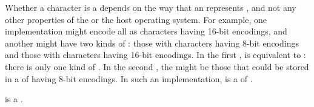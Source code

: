% 
 
Whether a character is a  depends on the way 
that an  represents , 
and not any other properties of the  or the host operating system.  
For example, one implementation might encode all  
as characters having 16-bit encodings, and another might have
two kinds of : those with characters having 8-bit 
encodings and those with characters having 16-bit encodings.  In the
first ,  is equivalent to
: there is only one kind of .
In the second , the  might be 
those  that could be stored in a  of 
having 8-bit encodings.  In such an implementation,
 is a  of .
 
 is a 
.


\endcom%

